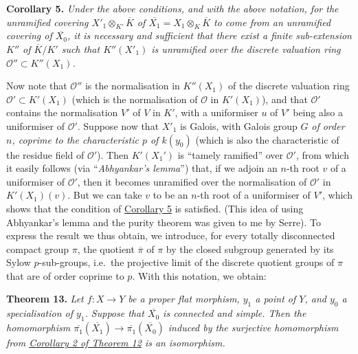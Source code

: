 \documentclass{article}
\newenvironment{itenv}[1]
  {\phantomsection\par\smallskip\noindent\textbf{#1.}\itshape}
  {\par\smallskip}
\newcommand{\oldpage}[1]{\marginpar{\footnotesize$\Big\vert$ \textit{p.~#1}}}
\theoremstyle{definition}
\theoremstyle{definition}
\theoremstyle{definition}
\theoremstyle{definition}
\theoremstyle{remark}
\begin{document}
\leavevmode{}%
\begin{itenv}{Corollary 5}
Under the above conditions, and with the above notation, for the unramified covering \(X'_1\otimes_{K'}\overline{K}\) of \(\overline{X_1}=X_1\otimes_K\overline{K}\) to come from an unramified covering of \(\overline{X_0}\), it is necessary and sufficient that there exist a finite sub-extension \(K''\) of \(\overline{K}/K'\) such that \(K''(X'_1)\) is unramified over the discrete valuation ring \({\mathscr{O}}''\subset K''(X_1)\).

\end{itenv}

Now note that \({\mathscr{O}}''\) is the normalisation in \(K''(X_1)\) of the discrete valuation ring \({\mathscr{O}}'\subset K'(X_1)\) (which is the normalisation of \({\mathscr{O}}\) in \(K'(X_1)\)), and that \({\mathscr{O}}'\) contains the normalisation \(V'\) of \(V\) in \(K'\), with a uniformiser \(u\) of \(V'\) being also a uniformiser of \({\mathscr{O}}'\).
Suppose now that \(X'_1\) is Galois, with Galois group \(G\) \emph{of order \(n\), coprime to the characteristic \(p\) of \(k(y_0)\)} (which is also the characteristic of the residue field of \({\mathscr{O}}'\)).
Then \(K'(X_1')\) is ``tamely ramified'' over \({\mathscr{O}}'\), from which it easily follows (via ``\emph{Abhyankar's lemma}'') that, if we adjoin an \(n\)-th root \(v\) of a uniformiser of \({\mathscr{O}}'\), then it becomes unramified over the normalisation of \({\mathscr{O}}'\) in \(K'(X_1)(v)\).
But we can take \(v\) to be an \(n\)-th root of a uniformiser of \(V'\), which shows that the condition of \protect\hyperlink{fga-2-theorem-12-corollary-5}{Corollary 5} is satisfied.
(This idea of using Abhyankar's lemma and the purity theorem was given to me by Serre).
To express the result we thus obtain, we introduce, for every totally disconnected compact group \(\pi\), the quotient \(\overline{\pi}\) of \(\pi\) by the closed subgroup generated by its Sylow \(p\)-sub-groups, i.e.~the projective limit of the discrete quotient groups of \(\pi\) that are of order coprime to \(p\).
With this notation, we obtain:

\leavevmode{}%
\begin{itenv}{Theorem 13}
Let \(f\colon X\to Y\) be a proper flat morphism, \(y_1\) a point of \(Y\), and \(y_0\) a specialisation of \(y_1\).
Suppose that \(\overline{X_0}\) is connected and simple.
\oldpage{182-27}Then the homomorphism \(\overline{\pi_1}(\overline{X_1})\to\overline{\pi_1}(\overline{X_0})\) induced by the
surjective homomorphism from \protect\hyperlink{fga-2-theorem-12-corollary-2}{Corollary 2 of Theorem 12} is an \emph{isomorphism}.

\end{itenv}
\end{document}
